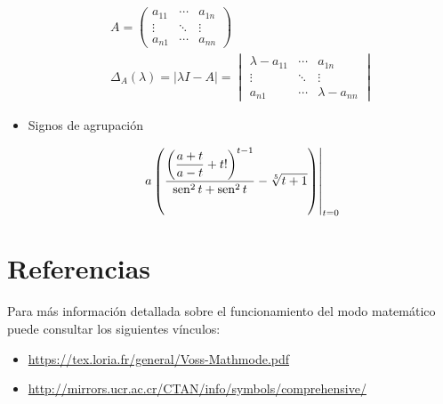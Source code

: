\documentclass[a4,10pt]{aleph-notas}
\theoremstyle{definition}
\theoremstyle{plain}
\begin{document}
\begin{itemize}
\begin{gather}
A=\begin{pmatrix}
a_{11}&\cdots&a_{1n}\\
\vdots&\ddots&\vdots\\
a_{n1}&\cdots&a_{nn}
\end{pmatrix}\\
\Delta_A(\lambda)=|\lambda I-A|=\begin{vmatrix}
\lambda-a_{11}&\cdots&a_{1n}\\
\vdots&\ddots&\vdots\\
a_{n1}&\cdots&\lambda-a_{nn}
\end{vmatrix}
\end{gather}
\item Signos de agrupación

\begin{equation*}
\left.a\left(\frac{\left(\dfrac{a+t}{a-t}+t!\right)^{t-1}}{\mathop{\rm sen}^2 t+\mathop{\rm sen}^2 t}-\sqrt[5]{t+1}\right)\right|_{t=0}
\end{equation*}
\end{itemize}


\section{Referencias}

Para más información detallada sobre el funcionamiento del modo matemático puede consultar los siguientes vínculos:

\begin{itemize}
    \item 
        \url{https://tex.loria.fr/general/Voss-Mathmode.pdf}
    \item
        \url{http://mirrors.ucr.ac.cr/CTAN/info/symbols/comprehensive/}
\end{itemize}
\end{document}
